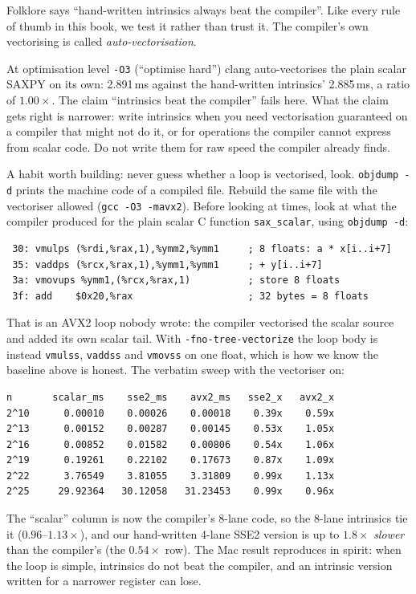 Folklore says ``hand-written intrinsics always beat the compiler''.
Like every rule of thumb in this book, we test it rather than trust it.
The compiler's own vectorising is called \emph{auto-vectorisation}.


\begin{example}
At optimisation level \texttt{-O3} (``optimise hard'') clang
auto-vectorises the plain scalar SAXPY on its own: 2.891\,ms against
the hand-written intrinsics' 2.885\,ms, a ratio of $1.00\times$. The
claim ``intrinsics beat the compiler'' fails here. What the claim gets
right is narrower: write intrinsics when you need vectorisation
guaranteed on a compiler that might not do it, or for operations
the compiler cannot express from scalar code. Do not write them for raw
speed the compiler already finds.
\end{example}

\begin{example}
A habit worth building: never guess whether a loop is vectorised, look.
\texttt{objdump -d} prints the machine code of a compiled file. Rebuild
the same file with the vectoriser allowed (\texttt{gcc -O3
-mavx2}). Before looking at times, look at what the compiler produced
for the plain scalar C function \texttt{sax\_scalar}, using
\texttt{objdump -d}:

{\scriptsize
\begin{verbatim}
 30: vmulps (%rdi,%rax,1),%ymm2,%ymm1     ; 8 floats: a * x[i..i+7]
 35: vaddps (%rcx,%rax,1),%ymm1,%ymm1     ; + y[i..i+7]
 3a: vmovups %ymm1,(%rcx,%rax,1)          ; store 8 floats
 3f: add    $0x20,%rax                    ; 32 bytes = 8 floats
\end{verbatim}
}
That is an AVX2 loop nobody wrote: the compiler vectorised the
scalar source and added its own scalar tail. With
\texttt{-fno-tree-vectorize} the loop body is instead
\texttt{vmulss}, \texttt{vaddss} and \texttt{vmovss} on one float, which is
how we know the baseline above is honest. The verbatim sweep with
the vectoriser on:

{\scriptsize
\begin{verbatim}
n       scalar_ms    sse2_ms    avx2_ms   sse2_x   avx2_x
2^10      0.00010    0.00026    0.00018    0.39x    0.59x
2^13      0.00152    0.00287    0.00145    0.53x    1.05x
2^16      0.00852    0.01582    0.00806    0.54x    1.06x
2^19      0.19261    0.22102    0.17673    0.87x    1.09x
2^22      3.76549    3.81055    3.31809    0.99x    1.13x
2^25     29.92364   30.12058   31.23453    0.99x    0.96x
\end{verbatim}
}
The ``scalar'' column is now the compiler's 8-lane code, so the
8-lane intrinsics tie it ($0.96$--$1.13\times$), and our hand-written
4-lane SSE2 version is up to $1.8\times$ \emph{slower} than the
compiler's (the $0.54\times$ row). The Mac result reproduces in
spirit: when the loop is simple, intrinsics do not beat the compiler,
and an intrinsic version written for a narrower register can lose.
\end{example}

